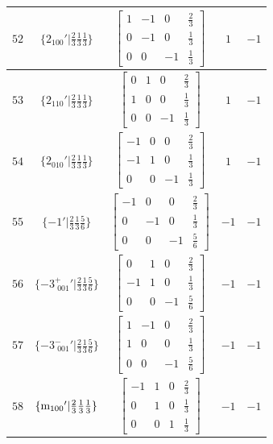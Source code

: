 \documentclass[fleqn,8pt]{jsarticle}
\begin{document}
\begin{longtable}{ccccc}
$ 52 $ & $ \{2{}_{100}{}'|\frac{2}{3} \frac{1}{3} \frac{1}{3}\} $ & $ \begin{bmatrix} 1 & -1 & 0 & \frac{2}{3} \\ 0 & -1 & 0 & \frac{1}{3} \\ 0 & 0 & -1 & \frac{1}{3} \end{bmatrix} $ & $ 1 $ & $ -1 $ \\ \hline
$ 53 $ & $ \{2{}_{110}{}'|\frac{2}{3} \frac{1}{3} \frac{1}{3}\} $ & $ \begin{bmatrix} 0 & 1 & 0 & \frac{2}{3} \\ 1 & 0 & 0 & \frac{1}{3} \\ 0 & 0 & -1 & \frac{1}{3} \end{bmatrix} $ & $ 1 $ & $ -1 $ \\ \hline
$ 54 $ & $ \{2{}_{010}{}'|\frac{2}{3} \frac{1}{3} \frac{1}{3}\} $ & $ \begin{bmatrix} -1 & 0 & 0 & \frac{2}{3} \\ -1 & 1 & 0 & \frac{1}{3} \\ 0 & 0 & -1 & \frac{1}{3} \end{bmatrix} $ & $ 1 $ & $ -1 $ \\ \hline
$ 55 $ & $ \{-1{}'|\frac{2}{3} \frac{1}{3} \frac{5}{6}\} $ & $ \begin{bmatrix} -1 & 0 & 0 & \frac{2}{3} \\ 0 & -1 & 0 & \frac{1}{3} \\ 0 & 0 & -1 & \frac{5}{6} \end{bmatrix} $ & $ -1 $ & $ -1 $ \\ \hline
$ 56 $ & $ \{-3^{+}_{\,\,001}{}'|\frac{2}{3} \frac{1}{3} \frac{5}{6}\} $ & $ \begin{bmatrix} 0 & 1 & 0 & \frac{2}{3} \\ -1 & 1 & 0 & \frac{1}{3} \\ 0 & 0 & -1 & \frac{5}{6} \end{bmatrix} $ & $ -1 $ & $ -1 $ \\ \hline
$ 57 $ & $ \{-3^{-}_{\,\,001}{}'|\frac{2}{3} \frac{1}{3} \frac{5}{6}\} $ & $ \begin{bmatrix} 1 & -1 & 0 & \frac{2}{3} \\ 1 & 0 & 0 & \frac{1}{3} \\ 0 & 0 & -1 & \frac{5}{6} \end{bmatrix} $ & $ -1 $ & $ -1 $ \\ \hline
$ 58 $ & $ \{{\rm m}_{100}{}'|\frac{2}{3} \frac{1}{3} \frac{1}{3}\} $ & $ \begin{bmatrix} -1 & 1 & 0 & \frac{2}{3} \\ 0 & 1 & 0 & \frac{1}{3} \\ 0 & 0 & 1 & \frac{1}{3} \end{bmatrix} $ & $ -1 $ & $ -1 $ \\ \hline

\end{longtable}
\end{document}
